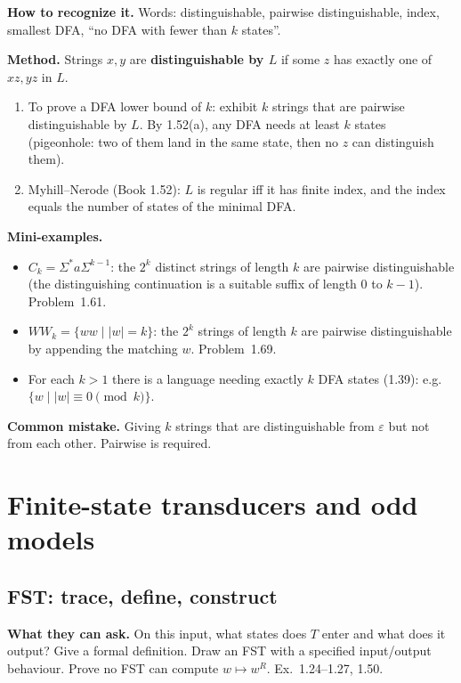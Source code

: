 \documentclass[11pt,a4paper]{article}
\newcommand{\eps}{\varepsilon}
\begin{document}
\textbf{How to recognize it.}
Words: distinguishable, pairwise distinguishable, index, smallest
DFA, ``no DFA with fewer than $k$ states''.

\textbf{Method.}
Strings $x,y$ are \textbf{distinguishable by $L$} if some $z$ has
exactly one of $xz,yz$ in $L$.

\begin{enumerate}
  \item To prove a DFA lower bound of $k$: exhibit $k$ strings that
        are pairwise distinguishable by $L$. By 1.52(a), any DFA needs
        at least $k$ states (pigeonhole: two of them land in the same
        state, then no $z$ can distinguish them).
  \item Myhill--Nerode (Book 1.52): $L$ is regular iff it has finite
        index, and the index equals the number of states of the
        minimal DFA.
\end{enumerate}

\textbf{Mini-examples.}
\begin{itemize}[nosep]
  \item $C_k=\Sigma^*a\Sigma^{k-1}$: the $2^k$ distinct strings of
        length $k$ are pairwise distinguishable (the distinguishing
        continuation is a suitable suffix of length $0$ to $k-1$).
        Problem~1.61.
  \item $WW_k=\{ww\mid |w|=k\}$: the $2^k$ strings of length $k$ are
        pairwise distinguishable by appending the matching $w$.
        Problem~1.69.
  \item For each $k>1$ there is a language needing exactly $k$ DFA
        states (1.39): e.g.\ $\{w\mid |w|\equiv 0\pmod k\}$.
\end{itemize}

\textbf{Common mistake.}
Giving $k$ strings that are distinguishable from $\eps$ but not from
each other. Pairwise is required.

\section{Finite-state transducers and odd models}

\subsection{FST: trace, define, construct}

\textbf{What they can ask.}
On this input, what states does $T$ enter and what does it output?
Give a formal definition. Draw an FST with a specified input/output
behaviour. Prove no FST can compute $w\mapsto w^R$. Ex.~1.24--1.27,
1.50.
\end{document}
